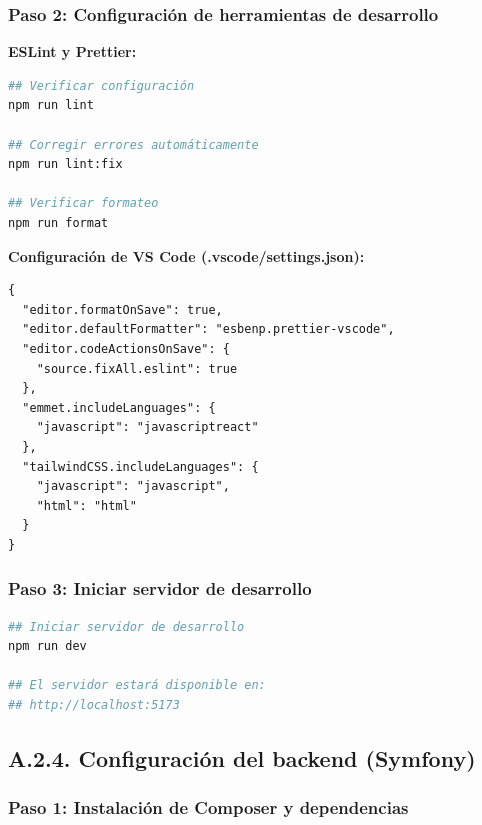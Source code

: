 \documentclass[12pt,a4paper,oneside]{report}
\begin{document}
{\subsubsection{Paso 2: Configuración de herramientas de
desarrollo}\label{paso-2-configuraciuxf3n-de-herramientas-de-desarrollo}

\textbf{ESLint y Prettier:}

\begin{lstlisting}[language=bash]
## Verificar configuración
npm run lint

## Corregir errores automáticamente
npm run lint:fix

## Verificar formateo
npm run format
\end{lstlisting}

\textbf{Configuración de VS Code (.vscode/settings.json):}

\begin{lstlisting}
{
  "editor.formatOnSave": true,
  "editor.defaultFormatter": "esbenp.prettier-vscode",
  "editor.codeActionsOnSave": {
    "source.fixAll.eslint": true
  },
  "emmet.includeLanguages": {
    "javascript": "javascriptreact"
  },
  "tailwindCSS.includeLanguages": {
    "javascript": "javascript",
    "html": "html"
  }
}
\end{lstlisting}

\subsubsection{Paso 3: Iniciar servidor de
desarrollo}\label{paso-3-iniciar-servidor-de-desarrollo}

\begin{lstlisting}[language=bash]
## Iniciar servidor de desarrollo
npm run dev

## El servidor estará disponible en:
## http://localhost:5173
\end{lstlisting}

\subsection{A.2.4. Configuración del backend
(Symfony)}\label{a.2.4.-configuraciuxf3n-del-backend-symfony}

\subsubsection{Paso 1: Instalación de Composer y
dependencias}\label{paso-1-instalaciuxf3n-de-composer-y-dependencias}

}
\end{document}
